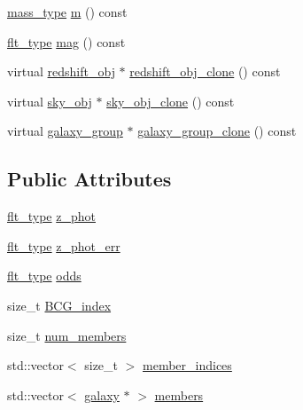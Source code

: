 \begin{DoxyCompactItemize}
\hyperlink{namespaceIceBRG_a1be72ac4918a9b029f2eefa084213e35}{mass\+\_\+type} \hyperlink{classIceBRG_1_1galaxy__group_a8fe2611b0f227d213768b8ef4b6b1150}{m} () const 
\item 
\hyperlink{lib_2IceBRG__main_2common_8h_ad0f130a56eeb944d9ef2692ee881ecc4}{flt\+\_\+type} \hyperlink{classIceBRG_1_1galaxy__group_aae14446ee20e2b7216317c1e8c7f4aeb}{mag} () const 
\item 
virtual \hyperlink{classIceBRG_1_1redshift__obj}{redshift\+\_\+obj} $\ast$ \hyperlink{classIceBRG_1_1galaxy__group_af0ee2e7b336371e8a8f098c3bfe7372d}{redshift\+\_\+obj\+\_\+clone} () const 
\item 
virtual \hyperlink{classIceBRG_1_1sky__obj}{sky\+\_\+obj} $\ast$ \hyperlink{classIceBRG_1_1galaxy__group_aa13d25256931c89489891ae8431672c7}{sky\+\_\+obj\+\_\+clone} () const 
\item 
virtual \hyperlink{classIceBRG_1_1galaxy__group}{galaxy\+\_\+group} $\ast$ \hyperlink{classIceBRG_1_1galaxy__group_a6ff6cbd19bc3d744ffeb33e3f376cb19}{galaxy\+\_\+group\+\_\+clone} () const 
\end{DoxyCompactItemize}
\subsection*{Public Attributes}
\begin{DoxyCompactItemize}
\item 
\hyperlink{lib_2IceBRG__main_2common_8h_ad0f130a56eeb944d9ef2692ee881ecc4}{flt\+\_\+type} \hyperlink{classIceBRG_1_1galaxy__group_a5ce7db4f858d59074efd715ea205269b}{z\+\_\+phot}
\item 
\hyperlink{lib_2IceBRG__main_2common_8h_ad0f130a56eeb944d9ef2692ee881ecc4}{flt\+\_\+type} \hyperlink{classIceBRG_1_1galaxy__group_a6696a2e58e33e858f1dd40a285cf432a}{z\+\_\+phot\+\_\+err}
\item 
\hyperlink{lib_2IceBRG__main_2common_8h_ad0f130a56eeb944d9ef2692ee881ecc4}{flt\+\_\+type} \hyperlink{classIceBRG_1_1galaxy__group_a3dd2782cd0deb0fbe61c319d806c3fc5}{odds}
\item 
size\+\_\+t \hyperlink{classIceBRG_1_1galaxy__group_a61cded26fb8fca3131583ca6a41a3b8e}{B\+C\+G\+\_\+index}
\item 
size\+\_\+t \hyperlink{classIceBRG_1_1galaxy__group_aca3ba15cea4121df150b6e03f59c32b2}{num\+\_\+members}
\item 
std\+::vector$<$ size\+\_\+t $>$ \hyperlink{classIceBRG_1_1galaxy__group_ab44f3aa3551d17e31d909615004d5508}{member\+\_\+indices}
\item 
std\+::vector$<$ \hyperlink{classIceBRG_1_1galaxy}{galaxy} $\ast$ $>$ \hyperlink{classIceBRG_1_1galaxy__group_a1c2634adaa0d697d1d533d76fd949411}{members}
\end{DoxyCompactItemize}


